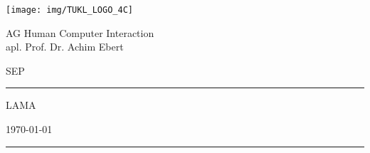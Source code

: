 \thispagestyle{empty}
	\newcommand{\Rule}{\rule{\textwidth}{0.5mm}}
	\begin{center}
	{\Large \texttt{[image: img/TUKL\_LOGO\_4C]} \par}

	\vspace{0.5em}

	{\Large AG Human Computer Interaction \\ apl. Prof. Dr. Achim Ebert \par}

	\vspace{0.5em}

	{\Large SEP \the\year \par}


	\vspace{5cm}

	\Rule

	\vspace{1cm}

	{\Huge LAMA \par}

	\vspace{0.5em}

	{\Large \mysubject \par}

	\vspace{0.5em}

	{\small \today \par}

	\vspace{0.7cm}

	\Rule


	\vfill %


	\emph{\textbf{\mygroup}} \\[1em]
	\myauthor

	\end{center}
